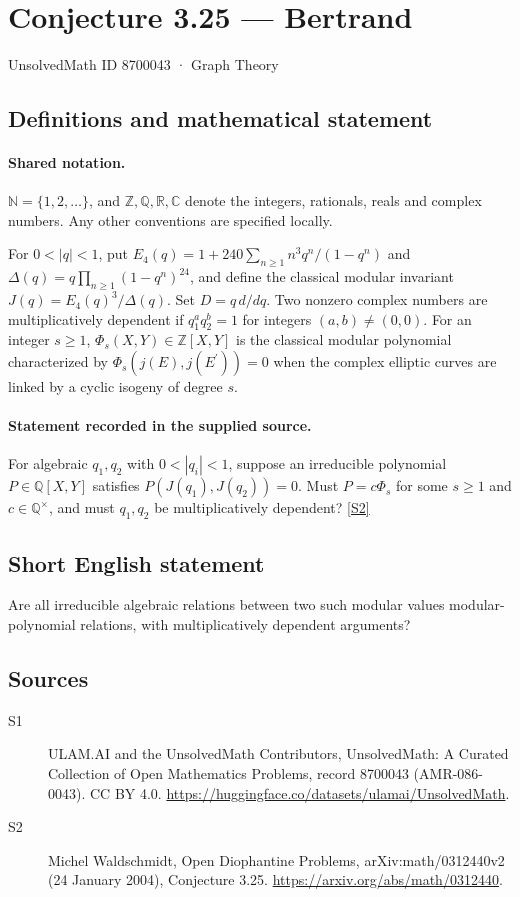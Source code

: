 \documentclass[11pt]{article}
\newcommand{\sref}[2]{\hyperlink{source:#1:#2}{[S#2]}}
\begin{document}
\setcounter{section}{8700042}
\section{Conjecture 3.25 — Bertrand}\label{8700043}
{\small\sffamily UnsolvedMath ID 8700043 · Graph Theory}
\subsection{Definitions and mathematical statement}

\paragraph{Shared notation.}$\mathbb N=\{1,2,\ldots\}$, and $\mathbb Z,\mathbb Q,\mathbb R,\mathbb C$ denote the integers, rationals, reals and complex numbers. Any other conventions are specified locally.


For $0<|q|<1$, put $E_4(q)=1+240\sum_{n\ge1}n^3q^n/(1-q^n)$ and $\Delta(q)=q\prod_{n\ge1}(1-q^n)^{24}$, and define the classical modular invariant $J(q)=E_4(q)^3/\Delta(q)$. Set $D=q\,d/dq$. Two nonzero complex numbers are multiplicatively dependent if $q_1^a q_2^b=1$ for integers $(a,b)\ne(0,0)$. For an integer $s\ge1$, $\Phi_s(X,Y)\in\mathbb Z[X,Y]$ is the classical modular polynomial characterized by $\Phi_s(j(E),j(E^{\prime}))=0$ when the complex elliptic curves are linked by a cyclic isogeny of degree $s$.
\paragraph{Statement recorded in the supplied source.}
For algebraic $q_1,q_2$ with $0<|q_i|<1$, suppose an irreducible polynomial $P\in\mathbb Q[X,Y]$ satisfies $P(J(q_1),J(q_2))=0$. Must $P=c\Phi_s$ for some $s\ge1$ and $c\in\mathbb Q^\times$, and must $q_1,q_2$ be multiplicatively dependent? \sref{8700043}{2}
\subsection{Short English statement}
Are all irreducible algebraic relations between two such modular values modular-polynomial relations, with multiplicatively dependent arguments?
\subsection{Sources}
\begin{description}
\item[\hypertarget{source:8700043:1}{S1}] ULAM.AI and the UnsolvedMath Contributors, UnsolvedMath: A Curated Collection of Open Mathematics Problems, record 8700043 (AMR-086-0043). CC BY 4.0. \url{https://huggingface.co/datasets/ulamai/UnsolvedMath}.
\item[\hypertarget{source:8700043:2}{S2}] Michel Waldschmidt, Open Diophantine Problems, arXiv:math/0312440v2 (24 January 2004), Conjecture 3.25. \url{https://arxiv.org/abs/math/0312440}.
\end{description}
\label{end:8700043}
\end{document}
